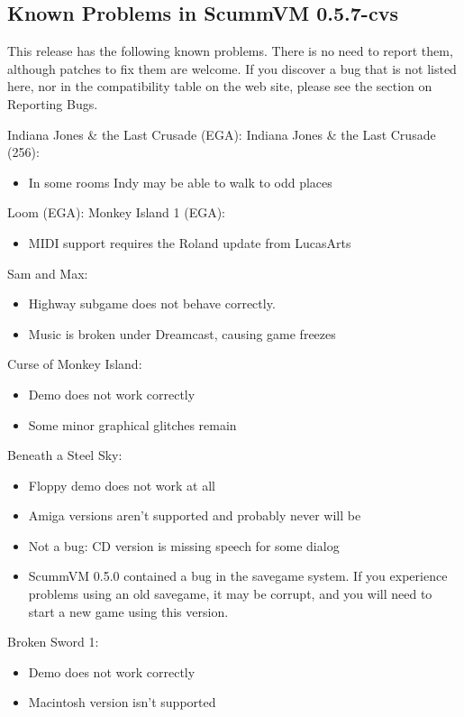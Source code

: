 

\subsection{Known Problems in ScummVM 0.5.7-cvs}

This release has the following known problems. There is no need to report them,
although patches to fix them are welcome. If you discover a bug that is not
listed here, nor in the compatibility table on the web site, please see
the section on Reporting Bugs.

Indiana Jones \& the Last Crusade (EGA):
Indiana Jones \& the Last Crusade (256):
  \begin{itemize}
  \item In some rooms Indy may be able to walk to odd places
  \end{itemize}
Loom (EGA):
Monkey Island 1 (EGA):
  \begin{itemize}
  \item MIDI support requires the Roland update from LucasArts
  \end{itemize}
Sam and Max:
  \begin{itemize}
  \item Highway subgame does not behave correctly.
  \item Music is broken under Dreamcast, causing game freezes
  \end{itemize}
Curse of Monkey Island:
  \begin{itemize}
  \item Demo does not work correctly
  \item Some minor graphical glitches remain
  \end{itemize}
Beneath a Steel Sky:
  \begin{itemize}
  \item Floppy demo does not work at all
  \item Amiga versions aren't supported and probably never will be
  \item Not a bug: CD version is missing speech for some dialog
  \item ScummVM 0.5.0 contained a bug in the savegame system.
                  If you experience problems using an old savegame, it may be
                  corrupt, and you will need to start a new game using this
                  version.
  \end{itemize}
Broken Sword 1:
  \begin{itemize}
  \item Demo does not work correctly
  \item Macintosh version isn't supported
  \end{itemize}
